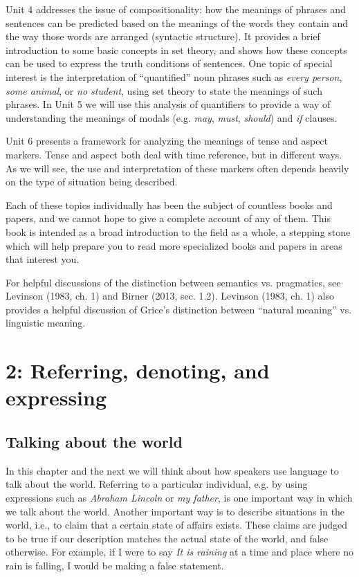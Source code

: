 Unit 4 addresses the issue of compositionality: how the meanings of phrases and sentences can be predicted based on the meanings of the words they contain and the way those words are arranged (syntactic structure). It provides a brief introduction to some basic concepts in set theory, and shows how these concepts can be used to express the truth conditions of sentences. One topic of special interest is the interpretation of “quantified” noun phrases such as \textit{every person}, \textit{some animal}, or \textit{no student}, using set theory to state the meanings of such phrases. In Unit 5 we will use this analysis of quantifiers to provide a way of understanding the meanings of modals (e.g. \textit{may}, \textit{must}, \textit{should}) and \textit{if} clauses.



Unit 6 presents a framework for analyzing the meanings of tense and aspect markers. Tense and aspect both deal with time reference, but in different ways. As we will see, the use and interpretation of these markers often depends heavily on the type of situation being described.



Each of these topics individually has been the subject of countless books and papers, and we cannot hope to give a complete account of any of them. This book is intended as a broad introduction to the field as a whole, a stepping stone which will help prepare you to read more specialized books and papers in areas that interest you.



\furtherreading



For helpful discussions of the distinction between semantics vs. pragmatics, see Levinson (1983, ch. 1) and Birner (2013, sec. 1.2). Levinson (1983, ch. 1) also provides a helpful discussion of Grice’s distinction between “natural meaning” vs. linguistic meaning.


\chapter{{2}: Referring, denoting, and expressing}

\section{Talking about the world}\label{sec:} %

In this chapter and the next we will think about how speakers use language to talk about the world. Referring to a particular individual, e.g. by using expressions such as \textit{Abraham Lincoln} or \textit{my father}, is one important way in which we talk about the world. Another important way is to describe situations in the world, i.e., to claim that a certain state of affairs exists. These claims are judged to be true if our description matches the actual state of the world, and false otherwise. For example, if I were to say \textit{It is raining} at a time and place where no rain is falling, I would be making a false statement.



